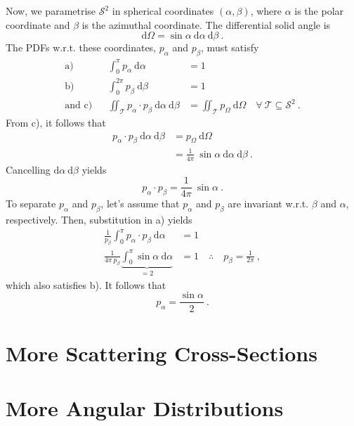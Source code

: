 \documentclass[10pt]{article}
\begin{document}
Now, we parametrise $\mathcal{S}^2$ in spherical coordinates $(\alpha,\beta)$, where $\alpha$ is the polar coordinate and $\beta$ is the azimuthal coordinate. 
The differential solid angle is
$$
\mathrm{d}\Omega = \sin\alpha \ \mathrm{d}\alpha \ \mathrm{d}\beta \ .
$$
The PDFs w.r.t. these coordinates, $p_{\alpha}$ and $p_\beta$, must satisfy
$$
\begin{aligned}
\text{a)}&&
\int_0^\pi p_{\alpha} \ \mathrm{d}\alpha &= 1
\\
\text{b)}&&
\int_0^{2\pi} p_{\beta} \ \mathrm{d}\beta &= 1
\\
\text{and c)}&&
\iint_{\mathcal{T}} p_\alpha \cdot p_\beta \ \mathrm{d}\alpha\ \mathrm{d}\beta
&=
\iint_{\mathcal{T}} p_\Omega \ \mathrm{d}\Omega
\quad\forall\ \mathcal{T}\subseteq\mathcal{S}^2
\ .
\end{aligned}
$$
From \mbox{c)}, it follows that
$$
\begin{aligned}
p_\alpha \cdot p_\beta \ \mathrm{d}\alpha\ \mathrm{d}\beta &= p_\Omega \ \mathrm{d}\Omega
\\
&= \frac{1}{4\pi} \ \sin\alpha \ \mathrm{d}\alpha \ \mathrm{d}\beta \ .
\end{aligned}
$$
Cancelling $\mathrm{d}\alpha\ \mathrm{d}\beta$ yields
$$
p_\alpha \cdot p_\beta = \frac{1}{4\pi} \ \sin\alpha \ .
$$
To separate $p_\alpha$ and $p_\beta$, let's assume that $p_\alpha$ and $p_\beta$ are invariant w.r.t. $\beta$ and $\alpha$, respectively. 
Then, substitution in \mbox{a)} yields
$$
\begin{aligned}
\frac{1}{p_\beta} \int_0^\pi p_\alpha \cdot p_\beta \ \mathrm{d}\alpha &= 1
\\
\frac{1}{4\pi\ p_\beta} \underbrace{\int_0^\pi \sin\alpha \ \mathrm{d}\alpha}_{=2} &= 1
\quad\therefore\quad
p_\beta = \frac{1}{2\pi}
\ ,
\end{aligned}
$$
which also satisfies \mbox{b)}. 
It follows that 
$$p_\alpha = \frac{\sin\alpha}{2} \ .$$







\section*{More Scattering Cross-Sections}




\section*{More Angular Distributions}
\end{document}
